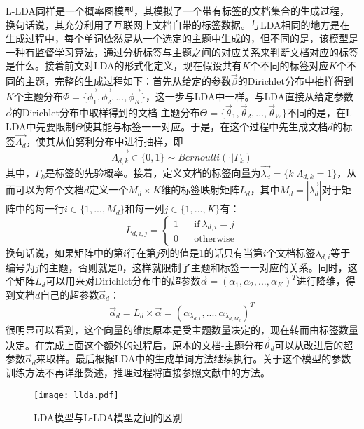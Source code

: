 L-LDA同样是一个概率图模型，其模拟了一个带有标签的文档集合的生成过程，换句话说，其充分利用了互联网上文档自带的标签数据。与LDA相同的地方是在生成过程中，每个单词依然是从一个选定的主题中生成的，但不同的是，该模型是一种有监督学习算法，通过分析标签与主题之间的对应关系来判断文档对应的标签是什么。接着前文对LDA的形式化定义，现在假设共有$K$个不同的标签对应$K$个不同的主题，完整的生成过程如下：首先从给定的参数$\vec{\beta}$的Dirichlet分布中抽样得到$K$个主题分布$\Phi=\{\vec{\phi_1},\vec{\phi_2},...,\vec{\phi_K}\}$，这一步与LDA中一样。与LDA直接从给定参数$\vec{\alpha}$的Dirichlet分布中取样得到的文档-主题分布$\Theta=\{\vec{\theta}_1,\vec{\theta}_2,...,\vec{\theta}_W\}$不同的是，在L-LDA中先要限制$\Theta$使其能与标签一一对应。于是，在这个过程中先生成文档$d$的标签$\vec{\Lambda_d}$，使其从伯努利分布中进行抽样，即
\begin{equation*}
  \vec{\Lambda_{d,k}}\in \{0,1\}\sim Bernoulli(\cdot|\Gamma_k)
\end{equation*}
其中，$\Gamma_k$是标签的先验概率。接着，定义文档的标签向量为$\vec{\lambda_d}=\{k|\Lambda_{d,k}=1\}$，从而可以为每个文档$d$定义一个$M_d\times K$维的标签映射矩阵$L_d$，其中$M_d=|\vec{\lambda_d}|$对于矩阵中的每一行$i\in \{1,...,M_d\}$和每一列$j\in \{1,...,K\}$有：
\begin{equation}
  L_{d,i,j}=\left\{
  \begin{aligned}
    1 && \mbox{if}~\lambda_{d,i}=j \\
    0 && \mbox{otherwise}
  \end{aligned}
  \right.
\end{equation}
换句话说，如果矩阵中的第$i$行在第$j$列的值是1的话只有当第$i$个文档标签$\lambda_{d,i}$等于编号为$j$的主题，否则就是0，这样就限制了主题和标签一一对应的关系。同时，这个矩阵$L_d$可以用来对Dirichlet分布中的超参数$\vec{\alpha}=(\alpha_1,\alpha_2,...,\alpha_K)^T$进行降维，得到文档$d$自己的超参数$\vec{\alpha}_d$：
\begin{equation}
  \vec{\alpha}_d=L_d\times \vec{\alpha}=(\alpha_{\lambda_{d,1}},...,\alpha_{\lambda_{d,M_d}})^T
\end{equation}
很明显可以看到，这个向量的维度原本是受主题数量决定的，现在转而由标签数量决定。在完成上面这个额外的过程后，原本的文档-主题分布$\vec{\theta}_d$可以从改进后的超参数$\vec{\alpha}_d$来取样。最后根据LDA中的生成单词方法继续执行。关于这个模型的参数训练方法不再详细赘述，推理过程将直接参照文献\cite{ramage2009labeled}中的方法。

\begin{figure}[ht]
\centering
\texttt{[image: llda.pdf]}
\caption{LDA模型与L-LDA模型之间的区别}
\label{fig:llda}
\end{figure}

